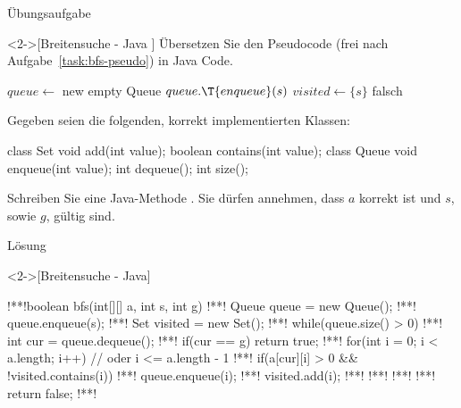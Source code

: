 \begin{frame}[fragile,c]{Übungsaufgabe}
    \begin{exercise}<2->[Breitensuche - Java ]
        \pause{}Übersetzen Sie den Pseudocode (frei nach Aufgabe~\ref{task:bfs-pseudo}) in Java Code.
\par\pause
{}%
%
%
%
%
\begin{minipage}{.5\linewidth}\scriptsize{}\SetAlgoVlined%
\begin{algorithm}[H]
\PreCode\StartCode
\(queue \leftarrow\) new empty Queue\;
\(queue.\T{enqueue}(s)\)\;
\(visited \leftarrow \{s\}\)\;
\KwRet falsch\;
\end{algorithm}\end{minipage}\hfill\begin{minipage}{.465\linewidth}%
    \pause{}Gegeben seien die folgenden, korrekt implementierten Klassen:\pause
\begin{plainjava}
class Set {
  void add(int value);
  boolean contains(int value);
}
class Queue {
  void enqueue(int value);
  int dequeue();
  int size();
}
\end{plainjava}
\end{minipage}\par
Schreiben Sie eine Java-Methode . Sie dürfen annehmen, dass \(a\) korrekt ist und \(s\), sowie \(g\), gültig sind.
    \end{exercise}
\end{frame}

\begin{frame}[fragile,c]{Lösung}
    \begin{solve}<2->[Breitensuche - Java]
\begin{plainjava}[morekeywords={[4]{enqueue,dequeue,contains,add,size}}]
!**!boolean bfs(int[][] a, int s, int g) {
!**!    Queue queue = new Queue();
!**!    queue.enqueue(s);
!**!    Set visited = new Set();
!**!    while(queue.size() > 0) {
!**!        int cur = queue.dequeue();
!**!        if(cur == g) return true;
!**!        for(int i = 0; i < a.length; i++) { // oder i <= a.length - 1
!**!            if(a[cur][i] > 0 && !visited.contains(i)) {
!**!                queue.enqueue(i);
!**!                visited.add(i);
!**!            }
!**!        }
!**!    }
!**!    return false;
!**!}
\end{plainjava}
    \end{solve}
\end{frame}
\fi
